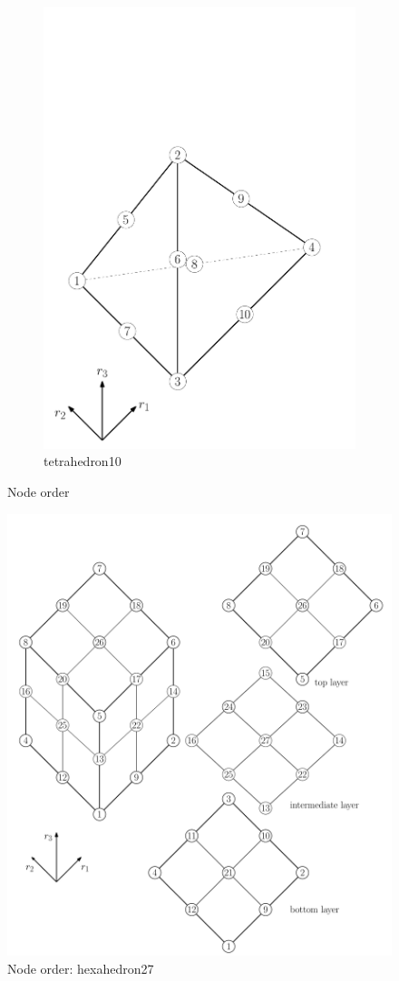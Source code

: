 \begin{figure}[htb]
\begin{subfigure}{0.5\textwidth}
    \includegraphics[width=.5\textwidth]{tetrahedron10h}
    \caption{tetrahedron10}
    \label{fig:EL:SOLID:TETRAHEDRON10H}
  \end{subfigure}
  \caption{Node order}
  \label{fig:EL:SOLID:NODE_ORDER}
\end{figure}

\begin{figure}[htb]
\centering
\includegraphics[width=.5\textwidth]{hexahedron27}
\caption{Node order: hexahedron27}
\label{fig:EL:SOLID:HEXAHEDRON27}
\end{figure}

